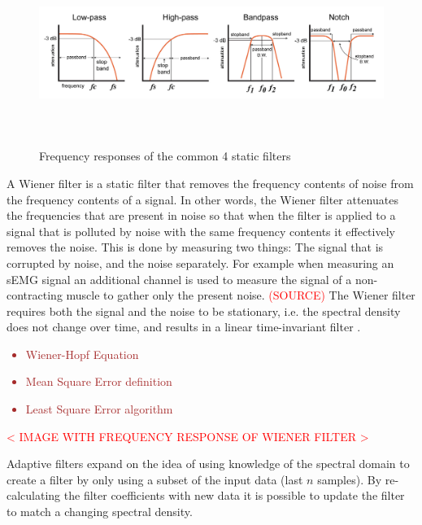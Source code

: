 \begin{figure}[h!t]
	\begin{center}
		\includegraphics[height=60mm]{images/Davis_intro_to_filters_filter_types.png}
	\end{center}
	\caption{Frequency responses of the common 4 static filters \cite{intro_to_static_filters}}
	\label{fig:static_filters}
\end{figure}

A Wiener filter is a static filter that removes the frequency contents of noise from the frequency contents of a signal. In other words, the Wiener filter attenuates the frequencies that are present in noise so that when the filter is applied to a signal that is polluted by noise with the same frequency contents it effectively removes the noise. This is done by measuring two things: The signal that is corrupted by noise, and the noise separately. For example when measuring an sEMG signal an additional channel is used to measure the signal of a non-contracting muscle to gather only the present noise. \textcolor{red}{(SOURCE)}
The Wiener filter requires both the signal and the noise to be stationary, i.e. the spectral density does not change over time, and results in a linear time-invariant filter \cite{wiki:Stationary_process} \cite{difference_stationary_nonstationary}.

\textcolor{brown}{\begin{itemize}
    \item Wiener-Hopf Equation
    \item Mean Square Error definition
    \item Least Square Error algorithm
\end{itemize}}

\textcolor{red}{< IMAGE WITH FREQUENCY RESPONSE OF WIENER FILTER > }

Adaptive filters expand on the idea of using knowledge of the spectral domain to create a filter by only using a subset of the input data (last $n$ samples). By re-calculating the filter coefficients with new data it is possible to update the filter to match a changing spectral density. 

